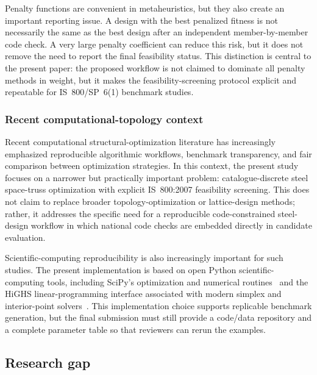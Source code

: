 \documentclass[lineno,pdflatex,sn-mathphys-num]{sn-jnl}
\begin{document}
Penalty functions are convenient in metaheuristics, but they also create an
important reporting issue. A design with the best penalized fitness is not
necessarily the same as the best design after an independent member-by-member
code check. A very large penalty coefficient can reduce this risk, but it does
not remove the need to report the final feasibility status. This distinction is
central to the present paper: the proposed workflow is not claimed to dominate
all penalty methods in weight, but it makes the feasibility-screening protocol
explicit and repeatable for IS~800/SP~6(1) benchmark studies.

\subsubsection{Recent computational-topology context}


Recent computational structural-optimization literature has increasingly emphasized
reproducible algorithmic workflows, benchmark transparency, and fair comparison
between optimization strategies. In this context, the present study focuses on a
narrower but practically important problem: catalogue-discrete steel space-truss
optimization with explicit IS~800:2007 feasibility screening. This does not claim to
replace broader topology-optimization or lattice-design methods; rather, it addresses
the specific need for a reproducible code-constrained steel-design workflow in which
national code checks are embedded directly in candidate evaluation.

Scientific-computing reproducibility is also increasingly important for such
studies. The present implementation is based on open Python scientific-computing
tools, including SciPy's optimization and numerical routines~\citep{Virtanen2020}
and the HiGHS linear-programming interface associated with modern simplex and
interior-point solvers~\citep{Huangfu2018}. This implementation choice supports
replicable benchmark generation, but the final submission must still provide a
code/data repository and a complete parameter table so that reviewers can rerun
the examples.

\subsection{Research gap}
\label{sec:gap}
\end{document}
